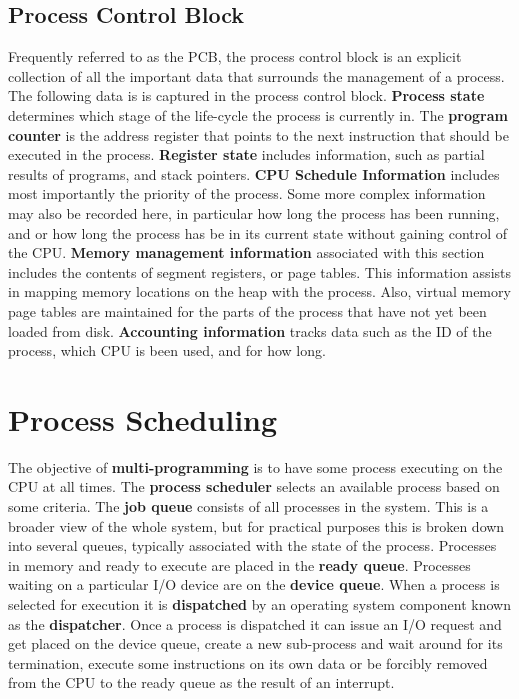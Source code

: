 \documentclass[10pt,a4paper]{article}
\begin{document}
\subsection{Process Control Block}
Frequently referred to as the PCB, the process control block is an explicit collection of all the important data that surrounds the management of a process. The following data is is captured in the process control block. 
\newline\newline
{\bf Process state} determines which stage of the life-cycle the process is currently in. The {\bf program counter} is the address register that points to the next instruction that should be executed in the process. {\bf Register state} includes information, such as partial results of programs, and stack pointers. {\bf CPU Schedule Information} includes most importantly the priority of the process. Some more complex information may also be recorded here, in particular how long the process has been running, and or how long the process has be in its current state without gaining control of the CPU.  {\bf Memory management information} associated with this section includes the contents of segment registers, or page tables. This information assists in mapping memory locations on the heap with the process. Also, virtual memory page tables are maintained for the parts of the process that have not yet been loaded from disk. {\bf Accounting information} tracks data such as the ID of the process, which CPU is been used, and for how long.
\section{Process Scheduling}
The objective of {\bf multi-programming} is to have some process executing on the CPU at all times. The {\bf process scheduler} selects an available process based on some criteria. The {\bf job queue} consists of all processes in the system. This is a broader view of the whole system, but for practical purposes this is broken down into several queues, typically associated with the state of the process. Processes in memory and ready to execute are placed in the {\bf ready queue}.  Processes waiting on a particular I/O device are on the {\bf device queue}. When a process is selected for execution it is {\bf dispatched} by an operating system component known as the {\bf dispatcher}. Once a process is dispatched it can issue an I/O request and get placed on the device queue, create a new sub-process and wait around for its termination, execute some instructions on its own data or be forcibly removed from the CPU to the ready queue as the result of an interrupt. 
\end{document}
